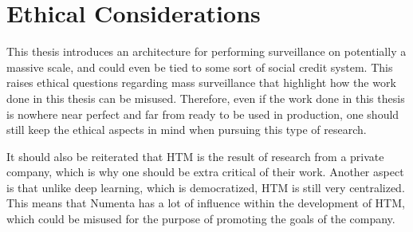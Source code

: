 \section{Ethical Considerations}
This thesis introduces an architecture for performing surveillance on potentially a massive scale, and could even be tied to some sort of social credit system. This raises ethical questions regarding mass surveillance that highlight how the work done in this thesis can be misused. Therefore, even if the work done in this thesis is nowhere near perfect and far from ready to be used in production, one should still keep the ethical aspects in mind when pursuing this type of research.
\par
It should also be reiterated that HTM is the result of research from a private company, which is why one should be extra critical of their work. Another aspect is that unlike deep learning, which is democratized, HTM is still very centralized. This means that Numenta has a lot of influence within the development of HTM, which could be misused for the purpose of promoting the goals of the company.
